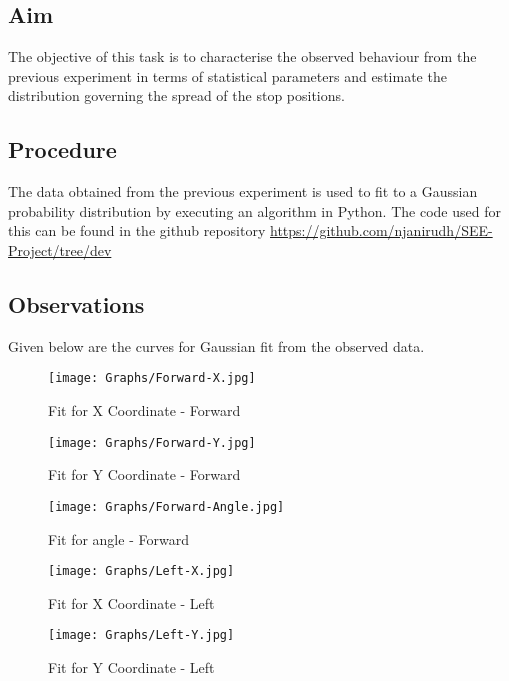 \documentclass[10pt,a4paper]{article}
\begin{document}
\subsection{Aim}
\Large
The objective of this task is to characterise the observed behaviour from the previous experiment in terms of statistical parameters and estimate the distribution governing the spread of the stop positions.


\subsection{Procedure}


The data obtained from the previous experiment is used to fit to a Gaussian probability distribution by executing an algorithm in Python. The code used for this can be found in the github repository \href{https://github.com/njanirudh/SEE-Project/tree/dev}{https://github.com/njanirudh/SEE-Project/tree/dev}


\subsection{Observations}
		
Given below are the curves for Gaussian fit from the observed data.

\begin{figure}[H]
	\centering
	\texttt{[image: Graphs/Forward-X.jpg]}
	\caption{Fit for X Coordinate - Forward}
\end{figure}

\begin{figure}[H]
	\centering
	\texttt{[image: Graphs/Forward-Y.jpg]}
	\caption{Fit for Y Coordinate - Forward}
\end{figure}	

\begin{figure}[H]
	\centering
	\texttt{[image: Graphs/Forward-Angle.jpg]}
	\caption{Fit for angle - Forward}
\end{figure}

\begin{figure}[H]
	\centering
	\texttt{[image: Graphs/Left-X.jpg]}
	\caption{Fit for X Coordinate - Left}
\end{figure}

\begin{figure}[H]
	\centering
	\texttt{[image: Graphs/Left-Y.jpg]}
	\caption{Fit for Y Coordinate - Left}
\end{figure}	
\end{document}
